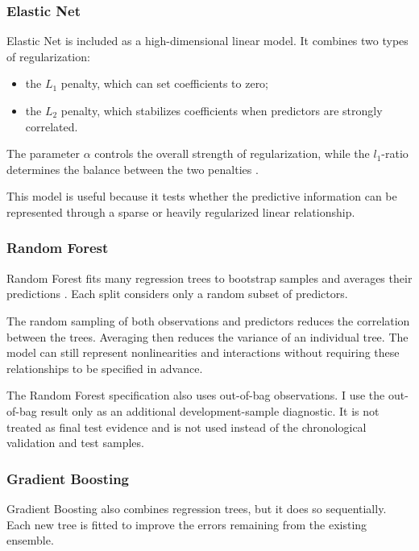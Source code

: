 \documentclass[11pt,a4paper]{article}
\begin{document}
\subsubsection*{Elastic Net}

Elastic Net is included as a high-dimensional linear model. It combines two
types of regularization:

\begin{itemize}
  \item the \(L_1\) penalty, which can set coefficients to zero;
  \item the \(L_2\) penalty, which stabilizes coefficients when predictors are
        strongly correlated.
\end{itemize}

The parameter \(\alpha\) controls the overall strength of regularization, while
the \(l_1\)-ratio determines the balance between the two penalties
\parencite{tibshirani1996regression,zou2005regularization}.

This model is useful because it tests whether the predictive information can be
represented through a sparse or heavily regularized linear relationship.

\subsubsection*{Random Forest}

Random Forest fits many regression trees to bootstrap samples and averages
their predictions \parencite{breiman2001random}. Each split considers only a
random subset of predictors.

The random sampling of both observations and predictors reduces the correlation
between the trees. Averaging then reduces the variance of an individual tree.
The model can still represent nonlinearities and interactions without requiring
these relationships to be specified in advance.

The Random Forest specification also uses out-of-bag observations. I use the
out-of-bag result only as an additional development-sample diagnostic. It is not
treated as final test evidence and is not used instead of the chronological
validation and test samples.

\subsubsection*{Gradient Boosting}

Gradient Boosting also combines regression trees, but it does so sequentially.
Each new tree is fitted to improve the errors remaining from the existing
ensemble.
\end{document}
